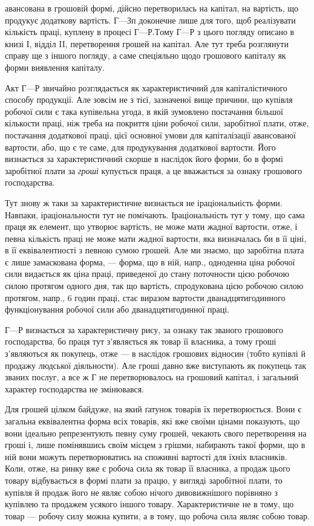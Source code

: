 \parcont{}  %
авансована в грошовій формі, дійсно перетворилась на капітал, на вартість,
що продукує додаткову вартість. $Г — Зп$ доконечне лише для того,
щоб реалізувати кількість праці, куплену в процесі $Г — Р. Т$ому $Г — Р$
з цього погляду описано в книзі І, відділ II, перетворення грошей
на капітал. Але тут треба розглянути справу ще з іншого погляду,
а саме спеціяльно щодо грошового капіталу як форми виявлення капіталу.

Акт $Г — Р$ звичайно розглядається як характеристичний для капіталістичного
способу продукції. Але зовсім не з тієї, зазначеної вище причини,
що купівля робочої сили є така купівельна угода, в якій зумовлено
постачання більшої кількости праці, ніж треба на покриття ціни робочої
сили, заробітної плати, отже, постачання додаткової праці, цієї основної
умови для капіталізації авансованої вартости, або, що є те саме, для
продукування додаткової вартости. Його визнається за характеристичний
скорше в наслідок його форми, бо в формі заробітної плати за \emph{гроші}
купується праця, а це вважається за ознаку грошового господарства.

Тут знову ж таки за характеристичне визнається не іраціональність
форми. Навпаки, іраціональности тут не помічають. Іраціональність тут у
тому, що сама праця як елемент, що утворює вартість, не може мати
жадної вартости, отже, і певна кількість праці не може мати жадної
вартости, яка визначалась би в її ціні, в її еквівалентності з певною
сумою грошей. Але ми знаємо, що заробітна плата є лише замаскована
форма, — форма, що в ній, напр., одноденна ціна робочої сили видається
як ціна праці, приведеної до стану поточности цією робочою силою протягом
одного дня, так що вартість, спродукована цією робочою силою
протягом, напр., 6 годин праці, стає виразом вартости дванадцятигодинного
функціонування робочої сили або дванадцятигодинної праці.

$Г — Р$ визнається за характеристичну рису, за ознаку так званого грошового
господарства, бо праця тут з’являється як товар її власника, а тому
гроші з’являються як покупець, отже — в наслідок грошових відносин
(тобто купівлі й продажу людської діяльности). Але гроші давно вже
виступають як покупець так званих послуг, а все ж Г не перетворювалось
на грошовий капітал, і загальний характер господарства не
змінювався.

Для грошей цілком байдуже, на який ґатунок товарів їх перетворюється.
Вони є загальна еквівалентна форма всіх товарів, які вже
своїми цінами показують, що вони ідеально репрезентують певну суму грошей,
чекають свого перетворення на гроші і, лише помінявшись своїм місцем
з грішми, набирають такої форми, що в ній вони можуть перетворюватись на
споживні вартості для їхніх власників. Коли, отже, на ринку вже є робоча
сила як товар її власника, а продаж цього товару відбувається в формі
плати за працю, у вигляді заробітної плати, то купівля й продаж його
не являє собою нічого дивовижнішого порівняно з купівлею та
продажем усякого іншого товару. Характеристичне не в тому, що товар
— робочу силу можна купити, а в тому, що робоча сила являє собою
товар.
